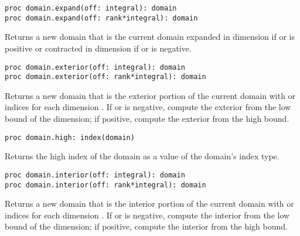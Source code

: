 
\begin{protohead}
\begin{verbatim}
proc domain.expand(off: integral): domain
proc domain.expand(off: rank*integral): domain
\end{verbatim}
\end{protohead}
\begin{protobody}
Returns a new domain that is the current domain expanded in
dimension  if  or  is positive or
contracted in dimension  if  or  is
negative.
\end{protobody}

\begin{protohead}
\begin{verbatim}
proc domain.exterior(off: integral): domain
proc domain.exterior(off: rank*integral): domain
\end{verbatim}
\end{protohead}
\begin{protobody}
Returns a new domain that is the exterior portion of the current
domain with  or  indices for each
dimension .  If  or  is negative,
compute the exterior from the low bound of the dimension; if positive,
compute the exterior from the high bound.
\end{protobody}

\begin{protohead}
\begin{verbatim}
proc domain.high: index(domain)
\end{verbatim}
\end{protohead}
\begin{protobody}
Returns the high index of the domain as a value of the domain's index
type.
\end{protobody}

\begin{protohead}
\begin{verbatim}
proc domain.interior(off: integral): domain
proc domain.interior(off: rank*integral): domain
\end{verbatim}
\end{protohead}
\begin{protobody}
Returns a new domain that is the interior portion of the current
domain with  or  indices for each
dimension .  If  or  is negative,
compute the interior from the low bound of the dimension; if positive,
compute the interior from the high bound.
\end{protobody}

